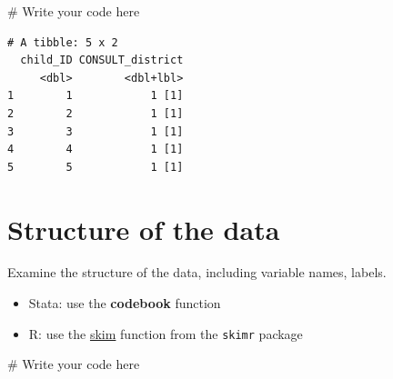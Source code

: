 \documentclass[
  letterpaper,
  DIV=11,
  numbers=noendperiod]{scrreprt}
\newenvironment{Shaded}{\begin{snugshade}}{\end{snugshade}}
\newcommand{\CommentTok}[1]{\textcolor[rgb]{0.37,0.37,0.37}{#1}}
\providecommand{\tightlist}{%
  \setlength{\itemsep}{0pt}\setlength{\parskip}{0pt}}\usepackage{longtable,booktabs,array}
\begin{document}
\begin{Shaded}
\begin{Highlighting}[]
\CommentTok{\# Write your code here}
\end{Highlighting}
\end{Shaded}

\begin{verbatim}
# A tibble: 5 x 2
  child_ID CONSULT_district
     <dbl>        <dbl+lbl>
1        1            1 [1]
2        2            1 [1]
3        3            1 [1]
4        4            1 [1]
5        5            1 [1]
\end{verbatim}

\hypertarget{structure-of-the-data}{%
\section{Structure of the data}\label{structure-of-the-data}}

Examine the structure of the data, including variable names, labels.

\begin{tcolorbox}[enhanced jigsaw, left=2mm, colback=white, coltitle=black, toptitle=1mm, bottomrule=.15mm, rightrule=.15mm, leftrule=.75mm, bottomtitle=1mm, colbacktitle=quarto-callout-tip-color!10!white, opacityback=0, arc=.35mm, colframe=quarto-callout-tip-color-frame, titlerule=0mm, title=\textcolor{quarto-callout-tip-color}{\faLightbulb}\hspace{0.5em}{Tip}, breakable, toprule=.15mm, opacitybacktitle=0.6]

\begin{itemize}
\tightlist
\item
  Stata: use the \textbf{codebook} function
\item
  R: use the
  \href{https://docs.ropensci.org/skimr/reference/skim.html}{skim}
  function from the \texttt{skimr} package
\end{itemize}

\end{tcolorbox}

\begin{Shaded}
\begin{Highlighting}[]
\CommentTok{\# Write your code here}
\end{Highlighting}
\end{Shaded}
\end{document}
